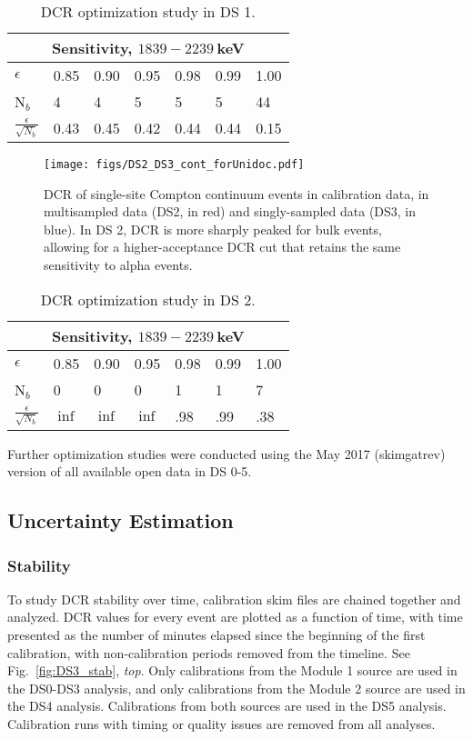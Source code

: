 \documentclass[groupedaddress,rmp,amsmath,amssymb,bibnotes,altaffilletter,twocolumn]{revtex4-1}
\begin{document}
\begin{table}[h]
\begin{tabular}{l | l l l l l l}
\hline
\multicolumn{7}{c}{Sensitivity, $1839 - 2239~$keV} \\
\hline
$\epsilon$ & 0.85 & 0.90 & 0.95 & 0.98 & 0.99 & 1.00 \\
N$_{b}$ & 4 & 4 & 5 & 5 & 5 & 44\\
$\frac{\epsilon}{\sqrt{N_b}}$ & 0.43 & 0.45 & 0.42 & 0.44 & 0.44 & 0.15\\
\end{tabular}
 \caption{DCR optimization study in DS 1.} 
 \label{tab:DCR_opt}
\end{table}

\begin{figure}[h]
 \centering
 \texttt{[image: figs/DS2\_DS3\_cont\_forUnidoc.pdf]}
 \caption{DCR of single-site Compton continuum events in calibration data, in multisampled data (DS2, in red) and singly-sampled data (DS3, in blue). In DS 2, DCR is more sharply peaked for bulk events, allowing for a higher-acceptance DCR cut that retains the same sensitivity to alpha events.} 
 \label{fig:DS2_DS3_comparison}
\end{figure}

\begin{table}[h]
\begin{tabular}{l | l l l l l l}
\hline
\multicolumn{7}{c}{Sensitivity, $1839 - 2239~$keV} \\
\hline
$\epsilon$ & 0.85 & 0.90 & 0.95 & 0.98 & 0.99 & 1.00 \\
N$_{b}$ & 0 & 0 & 0 & 1 & 1 & 7\\
$\frac{\epsilon}{\sqrt{N_b}}$ & $\inf$ & $\inf$ & $\inf$ & .98 & .99 & .38\\
\end{tabular}
 \caption{DCR optimization study in DS 2.} 
 \label{tab:DCR_opt_DS2}
\end{table}

Further optimization studies were conducted using the May 2017 (skimgatrev) version of all available open data in DS 0-5. 
\subsection{Uncertainty Estimation}
\subsubsection{Stability}
To study DCR stability over time, calibration skim files are chained together and analyzed.  DCR values for every event are plotted as a function of time, with time presented as the number of minutes elapsed since the beginning of the first calibration, with non-calibration periods removed from the timeline. See Fig.~\ref{fig:DS3_stab}, {\it top}. Only calibrations from the Module 1 source are used in the DS0-DS3 analysis, and only calibrations from the Module 2 source are used in the DS4 analysis.  Calibrations from both sources are used in the DS5 analysis. Calibration runs with timing or quality issues are removed from all analyses.  
\end{document}

